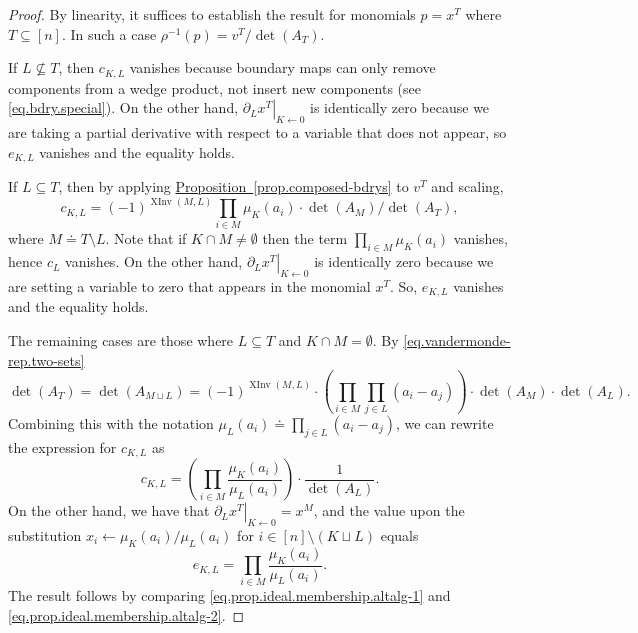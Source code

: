 \documentclass[11pt]{article}
\numberwithin{equation}{section}
\theoremstyle{definition}
\theoremstyle{plain}
\newcommand{\expref}[2]{\hyperref[#2]{#1~\ref{#2}}}
\newcommand{\Srepr}{\rho}
\newcommand{\PartialZero}[3]{\left.\partial_{#1} #3\right|_{#2 \gets 0}}
\newcommand{\Amat}[1]{A_{#1}}
\newcommand{\Adet}[1]{\det(\Amat{#1})}
\DeclareMathOperator{\XInv}{XInv}
\begin{document}
\begin{proof}
    By linearity, it suffices to establish the result for monomials $p=x^T$ where $T \subseteq [n]$. In such a case $\Srepr^{-1}(p)=v^T/\Adet{T}$. 

    If $L \not\subseteq T$, then $c_{K,L}$ vanishes because boundary maps can only remove components from a wedge product, not insert new components (see \eqref{eq.bdry.special}). On the other hand,  $\PartialZero{L}{K}{x^T}$ is identically zero because we are taking a partial derivative with respect to a variable that does not appear, so $e_{K,L}$ vanishes and the equality holds. 
    
    If $L \subseteq T$, then by applying \expref{Proposition}{prop.composed-bdrys} to $v^T$ and scaling, 
    \[ c_{K,L} = (-1)^{\XInv(M,L)} \prod_{i\in M} \mu_{K}(a_i)\cdot \Adet{M} / \Adet{T}, \]
    where $M \doteq T \setminus L$. 
    Note that if $K\cap M \ne \emptyset$ then the term $\prod_{i\in M} \mu_{K}(a_i)$ vanishes, hence $c_L$ vanishes. On the other hand, $\PartialZero{L}{K}{x^T}$ is identically zero because we are setting a variable to zero that appears in the monomial $x^T$. So, $e_{K,L}$ vanishes and the equality holds. 
    
    The remaining cases are those where $L \subseteq T$ and $K\cap M = \emptyset$. By \eqref{eq.vandermonde-rep.two-sets} 
    \[ \Adet{T} = \Adet{M \sqcup L} = (-1)^{\XInv(M,L)} \cdot \left( \prod_{i\in M}\prod_{j\in L}(a_i-a_j) \right) \cdot \Adet{M}\cdot \Adet{L}. \]
    Combining this with the notation $\mu_L(a_i) \doteq  \prod_{j\in L}(a_i-a_j)$, we can rewrite the expression for $c_{K,L}$ as
    \begin{equation}\label{eq.prop.ideal.membership.altalg-1}
    c_{K,L} = \left( \prod_{i\in M} \frac{\mu_K(a_i)}{\mu_L(a_i)}\right) \cdot \frac{1}{\Adet{L}}.
    \end{equation}
    On the other hand, we have that $\PartialZero{L}{K}{x^T} = x^M$, and the value upon the substitution $x_i\gets \mu_K(a_i)/\mu_L(a_i)$ for $i \in [n]\setminus (K \sqcup L)$ equals
    \begin{equation}\label{eq.prop.ideal.membership.altalg-2} e_{K,L} = \prod_{i\in M} \frac{\mu_K(a_i)}{\mu_L(a_i)}. 
    \end{equation}
    The result follows by comparing \eqref{eq.prop.ideal.membership.altalg-1} and \eqref{eq.prop.ideal.membership.altalg-2}. 
\end{proof}
\end{document}
